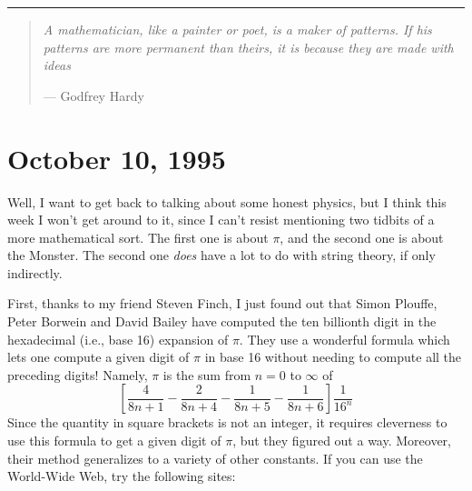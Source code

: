 \documentclass{article}
\renewcommand{\texttt}[1]{%
  \begingroup
  \ttfamily
  \begingroup\lccode`~=`/\lowercase{\endgroup\def~}{/\discretionary{}{}{}}%
  \begingroup\lccode`~=`[\lowercase{\endgroup\def~}{[\discretionary{}{}{}}%
  \begingroup\lccode`~=`.\lowercase{\endgroup\def~}{.\discretionary{}{}{}}%
  \catcode`/=\active\catcode`[=\active\catcode`.=\active
  \scantokens{#1\noexpand}%
  \endgroup
}
\begin{document}
\begin{center}\rule{0.5\linewidth}{0.5pt}\end{center}

\begin{quote}
\emph{A mathematician, like a painter or poet, is a maker of patterns.
If his patterns are more permanent than theirs, it is because they are
made with ideas}

--- Godfrey Hardy
\end{quote}



\hypertarget{week66}{%
\section{October 10, 1995}\label{week66}}

Well, I want to get back to talking about some honest physics, but I
think this week I won't get around to it, since I can't resist
mentioning two tidbits of a more mathematical sort. The first one is
about \(\pi\), and the second one is about the Monster. The second one
\emph{does} have a lot to do with string theory, if only indirectly.

First, thanks to my friend Steven Finch, I just found out that Simon
Plouffe, Peter Borwein and David Bailey have computed the ten billionth
digit in the hexadecimal (i.e., base 16) expansion of \(\pi\). They use
a wonderful formula which lets one compute a given digit of \(\pi\) in
base 16 without needing to compute all the preceding digits! Namely,
\(\pi\) is the sum from \(n = 0\) to \(\infty\) of \[
  \left[
    \frac{4}{8n+1} -\frac{2}{8n+4} -\frac{1}{8n+5} -\frac{1}{8n+6}
  \right] \frac{1}{16^n}
\] Since the quantity in square brackets is not an integer, it requires
cleverness to use this formula to get a given digit of \(\pi\), but they
figured out a way. Moreover, their method generalizes to a variety of
other constants. If you can use the World-Wide Web, try the following
sites:

\end{document}
